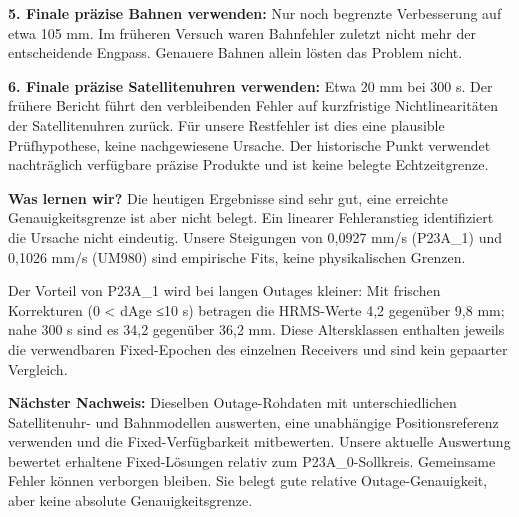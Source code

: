 \documentclass[11pt,a4paper]{article}
\begin{document}
\textbf{5. Finale präzise Bahnen verwenden:} Nur noch begrenzte Verbesserung auf etwa 105 mm. Im früheren Versuch waren Bahnfehler zuletzt nicht mehr der entscheidende Engpass. Genauere Bahnen allein lösten das Problem nicht.

\textbf{6. Finale präzise Satellitenuhren verwenden:} Etwa 20 mm bei 300 s. Der frühere Bericht führt den verbleibenden Fehler auf kurzfristige Nichtlinearitäten der Satellitenuhren zurück. Für unsere Restfehler ist dies eine plausible Prüfhypothese, keine nachgewiesene Ursache. Der historische Punkt verwendet nachträglich verfügbare präzise Produkte und ist keine belegte Echtzeitgrenze.

\textbf{Was lernen wir?} Die heutigen Ergebnisse sind sehr gut, eine erreichte Genauigkeitsgrenze ist aber nicht belegt. Ein linearer Fehleranstieg identifiziert die Ursache nicht eindeutig. Unsere Steigungen von 0,0927 mm/s (P23A\_1) und 0,1026 mm/s (UM980) sind empirische Fits, keine physikalischen Grenzen.

Der Vorteil von P23A\_1 wird bei langen Outages kleiner: Mit frischen Korrekturen (0 < dAge ≤10 s) betragen die HRMS-Werte 4,2 gegenüber 9,8 mm; nahe 300 s sind es 34,2 gegenüber 36,2 mm. Diese Altersklassen enthalten jeweils die verwendbaren Fixed-Epochen des einzelnen Receivers und sind kein gepaarter Vergleich.

\textbf{Nächster Nachweis:} Dieselben Outage-Rohdaten mit unterschiedlichen Satellitenuhr- und Bahnmodellen auswerten, eine unabhängige Positionsreferenz verwenden und die Fixed-Verfügbarkeit mitbewerten. Unsere aktuelle Auswertung bewertet erhaltene Fixed-Lösungen relativ zum P23A\_0-Sollkreis. Gemeinsame Fehler können verborgen bleiben. Sie belegt gute relative Outage-Genauigkeit, aber keine absolute Genauigkeitsgrenze.
\end{document}
